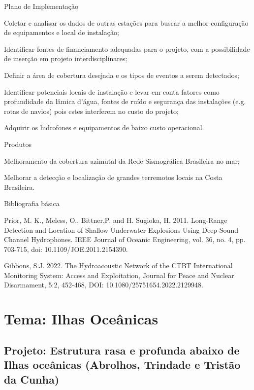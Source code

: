 \documentclass[10pt,a4paper,oneside]{book}
\begin{document}
\begin{fancyenum}{\faBrain}{Plano de Implementação}
	\item Coletar e analisar os dados de outras estações para buscar a melhor configuração de equipamentos e local de instalação;
	\item Identificar fontes de financiamento adequadas para o projeto, com a possibilidade de inserção em projeto interdisciplinares;
	\item Definir a área de cobertura desejada e os tipos de eventos a serem detectados;
	\item Identificar potenciais locais de instalação e levar em conta fatores como profundidade da lâmica d'água, fontes de ruído e segurança das instalações (e.g. rotas de navios) pois estes interferem no custo do projeto;
	\item Adquirir os hidrofones e equipamentos de baixo custo operacional.
\end{fancyenum}

\begin{fancyenum}{\faShoppingCart}{Produtos}
	\item Melhoramento da cobertura azimutal da Rede Sismográfica Brasileira no mar;
	\item Melhorar a detecção e localização de grandes terremotos locais na Costa Brasileira.
\end{fancyenum}

\begin{fancyenum}{\faBook}{Bibliografia básica}
	\item Prior, M. K., Meless, O., Bittner,P. and H. Sugioka, H. 2011. Long-Range Detection and Location of Shallow Underwater Explosions Using Deep-Sound-Channel Hydrophones. IEEE Journal of Oceanic Engineering, vol. 36, no. 4, pp. 703-715, doi: 10.1109/JOE.2011.2154390.
	\item Gibbons, S.J. 2022. The Hydroacoustic Network of the CTBT International Monitoring System: Access and Exploitation, Journal for Peace and Nuclear Disarmament, 5:2, 452-468, DOI: 10.1080/25751654.2022.2129948.
\end{fancyenum}


\section{Tema: Ilhas Oceânicas}

\subsection{Projeto: Estrutura rasa e profunda abaixo de Ilhas oceânicas (Abrolhos, Trindade e Tristão da Cunha)}
\end{document}
